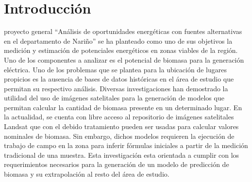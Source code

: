 \section{Introducción}

 proyecto general ``Análisis de oportunidades energéticas con fuentes
alternativas en el departamento de Nariño'' se ha planteado como uno de sus
objetivos la medición y estimación de potenciales energéticos en zonas viables
de la región. Uno de los componentes a analizar es el potencial de biomasa para
la generación eléctrica. Uno de los problemas que se plantea para la ubicación
de lugares propicios es la ausencia de bases de datos históricas en el área de
estudio que permitan su respectivo análisis.
Diversas investigaciones han demostrado la utilidad del uso de imágenes
satelitales para la generación de modelos que permitan calcular la cantidad de
biomasa presente en un determinado lugar. En la actualidad, se cuenta con
libre acceso al repositorio de imágenes satelitales Landsat que con el debido
tratamiento pueden ser usadas para calcular valores nominales de biomasa. Sin
embargo, dichos modelos requieren la ejecución de trabajo de campo en la zona
para inferir fórmulas iniciales a partir de la medición tradicional de una muestra.
Esta investigación esta orientada a cumplir con los requerimientos necesarios
para la generación de un modelo de predicción de biomasa y su extrapolación
al resto del área de estudio.
